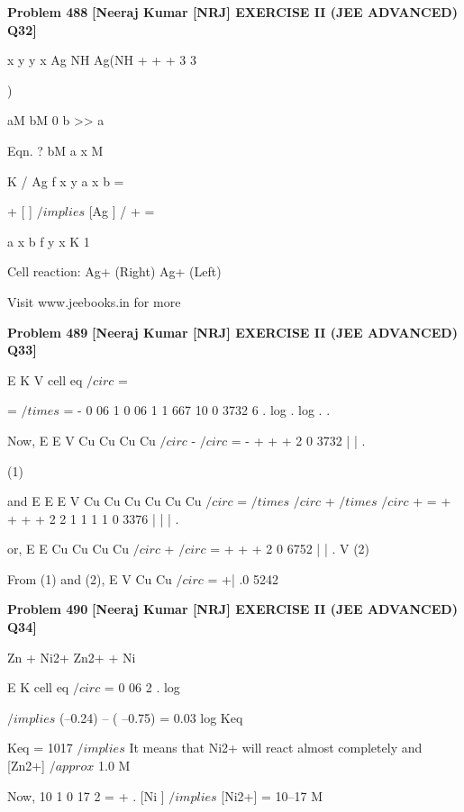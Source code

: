 \begin{problembox}
\textbf{Problem 488} \hfill \textbf{[Neeraj Kumar [NRJ] EXERCISE II (JEE ADVANCED) Q32]}
\label{q:ext-nrj_all_questions-488}

x
y
y
x
 Ag
 NH
Ag(NH
+
+
+
3
3

  


 



)
 
               aM        bM                          0            b >> a
 
 Eqn.        ?           bM                      a
x M
 
 
K
/
Ag
f
x
y
a x
b
=
 
+
[
]
 $/implies$ [Ag ]
/
+ =
 
 
 
  
 
  
a
x b
f
y
x
K
1
 
 Cell reaction: Ag+ (Right) 
 Ag+ (Left)
 
 
Visit www.jeebooks.in for more
\end{problembox}

\begin{problembox}
\textbf{Problem 489} \hfill \textbf{[Neeraj Kumar [NRJ] EXERCISE II (JEE ADVANCED) Q33]}
\label{q:ext-nrj_all_questions-489}

E
K
V
cell
eq
$/circ$
=
 
=
$/times$
= -
0 06
1
0 06
1
1 667
10
0 3732
6
.
log
.
log
.
.
 
 Now, E
E
V
Cu
Cu
Cu
Cu
$/circ$
-
$/circ$
= -
+
+
+
2
0 3732
|
|
.
 
(1)
 
 and E
E
E
V
Cu
Cu
Cu
Cu
Cu
Cu
$/circ$
=
$/times$
$/circ$
+ $/times$
$/circ$
+
=
+
+
+
+
2
2
1
1
1 1
0 3376
|
|
|
.
 
 or, E
E
Cu
Cu
Cu
Cu
$/circ$
+
$/circ$
=
+
+
+
2
0 6752
|
|
.
V 
(2)
 
 From (1) and (2), E
V
Cu
Cu
$/circ$
=
+|
.0 5242
\end{problembox}

\begin{problembox}
\textbf{Problem 490} \hfill \textbf{[Neeraj Kumar [NRJ] EXERCISE II (JEE ADVANCED) Q34]}
\label{q:ext-nrj_all_questions-490}

Zn + Ni2+   Zn2+ + Ni
 
 
E
K
cell
eq
$/circ$
= 0 06
2
.
log
 
 
 $/implies$ (--0.24) -- ( --0.75) = 0.03 log Keq
 
    Keq = 1017 $/implies$ It means that Ni2+ will react 
almost completely and [Zn2+] $/approx$ 1.0 M
 
 Now, 10
1 0
17
2
=
+
.
[Ni
]
 $/implies$ [Ni2+] = 10--17 M
\end{problembox}

